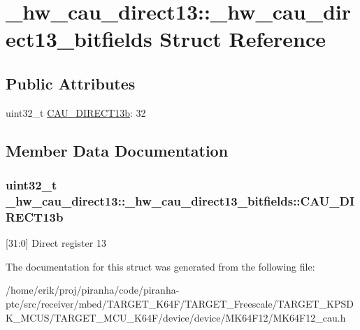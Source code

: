 \hypertarget{struct__hw__cau__direct13_1_1__hw__cau__direct13__bitfields}{}\section{\+\_\+hw\+\_\+cau\+\_\+direct13\+:\+:\+\_\+hw\+\_\+cau\+\_\+direct13\+\_\+bitfields Struct Reference}
\label{struct__hw__cau__direct13_1_1__hw__cau__direct13__bitfields}
\subsection*{Public Attributes}
\begin{DoxyCompactItemize}
\item 
uint32\+\_\+t \hyperlink{struct__hw__cau__direct13_1_1__hw__cau__direct13__bitfields_a10f4ae9c256e49fece5fabb03e7872de}{C\+A\+U\+\_\+\+D\+I\+R\+E\+C\+T13b}\+: 32
\end{DoxyCompactItemize}


\subsection{Member Data Documentation}
\subsubsection[{\texorpdfstring{C\+A\+U\+\_\+\+D\+I\+R\+E\+C\+T13b}{CAU_DIRECT13b}}]{\setlength{\rightskip}{0pt plus 5cm}uint32\+\_\+t \+\_\+hw\+\_\+cau\+\_\+direct13\+::\+\_\+hw\+\_\+cau\+\_\+direct13\+\_\+bitfields\+::\+C\+A\+U\+\_\+\+D\+I\+R\+E\+C\+T13b}\hypertarget{struct__hw__cau__direct13_1_1__hw__cau__direct13__bitfields_a10f4ae9c256e49fece5fabb03e7872de}{}\label{struct__hw__cau__direct13_1_1__hw__cau__direct13__bitfields_a10f4ae9c256e49fece5fabb03e7872de}
\mbox{[}31\+:0\mbox{]} Direct register 13 

The documentation for this struct was generated from the following file\+:\begin{DoxyCompactItemize}
\item 
/home/erik/proj/piranha/code/piranha-\/ptc/src/receiver/mbed/\+T\+A\+R\+G\+E\+T\+\_\+\+K64\+F/\+T\+A\+R\+G\+E\+T\+\_\+\+Freescale/\+T\+A\+R\+G\+E\+T\+\_\+\+K\+P\+S\+D\+K\+\_\+\+M\+C\+U\+S/\+T\+A\+R\+G\+E\+T\+\_\+\+M\+C\+U\+\_\+\+K64\+F/device/device/\+M\+K64\+F12/M\+K64\+F12\+\_\+cau.\+h\end{DoxyCompactItemize}
